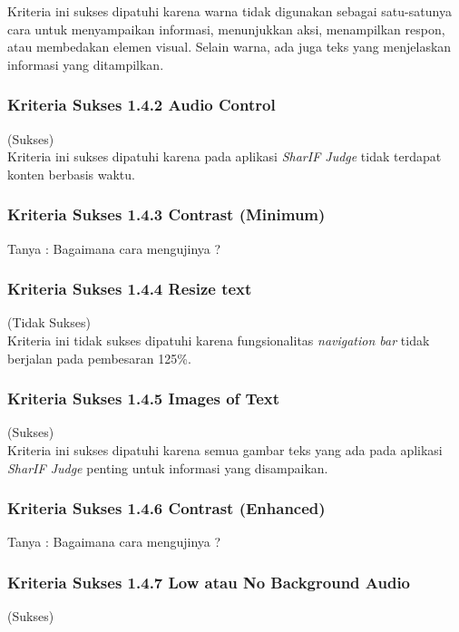 Kriteria ini sukses dipatuhi karena warna tidak digunakan sebagai satu-satunya cara untuk menyampaikan informasi, menunjukkan aksi, menampilkan respon, atau membedakan elemen visual. Selain warna, ada juga teks yang menjelaskan informasi yang ditampilkan.

\subsubsection{Kriteria Sukses 1.4.2 Audio Control}
\label{subsubsec:kepatuhan_kriteria_1.4.2}
(Sukses) \\

Kriteria ini sukses dipatuhi karena pada aplikasi \textit{SharIF Judge} tidak terdapat konten berbasis waktu.

\subsubsection{Kriteria Sukses 1.4.3 Contrast (Minimum)}
\label{subsubsec:kepatuhan_kriteria_1.4.3}

Tanya : Bagaimana cara mengujinya ?

\subsubsection{Kriteria Sukses 1.4.4 Resize text}
\label{subsubsec:kepatuhan_kriteria_1.4.4}
(Tidak Sukses) \\

Kriteria ini tidak sukses dipatuhi karena fungsionalitas \textit{navigation bar} tidak berjalan pada pembesaran 125\%.

\subsubsection{Kriteria Sukses 1.4.5 Images of Text}
\label{subsubsec:kepatuhan_kriteria_1.4.5}
(Sukses) \\

Kriteria ini sukses dipatuhi karena semua gambar teks yang ada pada aplikasi \textit{SharIF Judge} penting untuk informasi yang disampaikan.

\subsubsection{Kriteria Sukses 1.4.6 Contrast (Enhanced)}
\label{subsubsec:kepatuhan_kriteria_1.4.6}

Tanya : Bagaimana cara mengujinya ?

\subsubsection{Kriteria Sukses 1.4.7 Low atau No Background Audio}
\label{subsubsec:kepatuhan_kriteria_1.4.7}
(Sukses) \\


